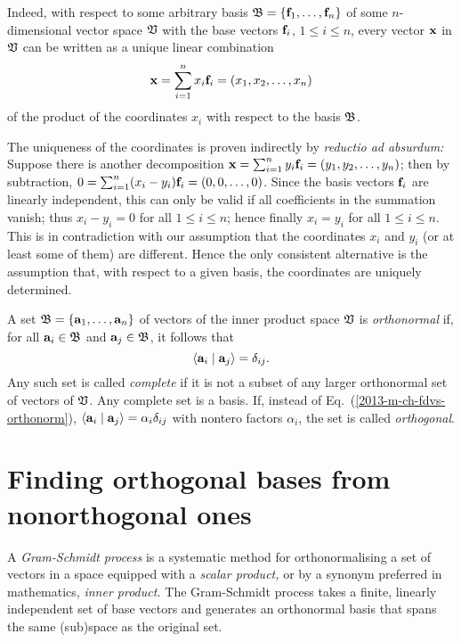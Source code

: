 Indeed, with respect to some arbitrary  basis ${\frak B}=\{
{\bf f}_1, \ldots , {\bf f}_n\}$ of some $n$-dimensional vector space ${\frak V}$
with the base vectors ${\bf f}_i$, $1\le i\le n$, every vector ${\bf x}$ in  ${\frak V}$
can be written as a unique linear combination
\begin{equation}
{\bf x} = \sum_{i=1}^n x_i{\bf f}_i = (x_1,x_2, \ldots , x_n)
\end{equation}
of the product of the coordinates $x_i$ with respect to the basis  ${\frak B}$.

{\color{OliveGreen}
\bproof
The uniqueness of the coordinates is proven indirectly by {\em reductio ad absurdum:}
Suppose there is another decomposition
${\bf x} = \sum_{i=1}^n y_i{\bf f}_i = (y_1,y_2, \ldots , y_n) $;
then by subtraction, $0 = \sum_{i=1}^n (x_i-y_i) {\bf f}_i = (0,0, \ldots , 0)$.
Since the basis vectors ${\bf f}_i$ are linearly independent,
this can only be valid if all coefficients in the summation  vanish;
thus $x_i-y_i=0$ for all $1\le i\le n$; hence finally  $x_i=y_i$ for all $1\le i\le n$.
This is in contradiction with our assumption that the coordinates $x_i$ and $y_i$
(or at least some of them) are different.
Hence the only consistent alternative is the assumption that, with respect to a given basis, the coordinates are uniquely determined.
\eproof
}

A  set    $\frak B = \{
{\bf a}_1, \ldots , {\bf a}_n\}$
of  vectors   of the inner product space $\frak V$
is {\em orthonormal}
if, for all
 ${\bf a}_i\in\frak B$ and
 ${\bf a}_j\in\frak B$,
it follows that
\begin{equation}
\langle {\bf a}_i \mid {\bf a}_j \rangle =\delta_{ij}.
\label{2013-m-ch-fdvs-orthonorm}
\end{equation}
Any such set is called {\em complete}
if it is not a subset of any larger orthonormal set of vectors of $\frak V$.
Any complete set is a basis.
If, instead of Eq.~(\ref{2013-m-ch-fdvs-orthonorm}),
$\langle {\bf a}_i \mid {\bf a}_j \rangle = \alpha_i \delta_{ij}$
with nontero factors $\alpha_i$, the set is called {\em orthogonal}.


\section{Finding orthogonal bases from nonorthogonal ones}

A {\em Gram-Schmidt process} is a systematic method for orthonormalising a set of vectors
in a space equipped with a {\em scalar product,}
or by a synonym preferred in mathematics, {\em inner product.}
The Gram-Schmidt process takes a finite, linearly independent set
of base vectors
and generates an orthonormal basis that spans the same (sub)space as the original set.

